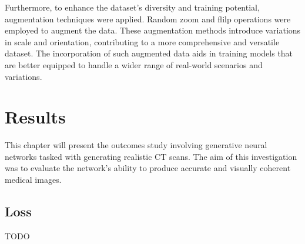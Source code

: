 \documentclass[11pt,a4paper]{report}
\begin{document}
Furthermore, to enhance the dataset's diversity and training potential, augmentation techniques were applied. Random zoom and flilp operations were employed to augment the data. These augmentation methods introduce variations in scale and orientation, contributing to a more comprehensive and versatile dataset. The incorporation of such augmented data aids in training models that are better equipped to handle a wider range of real-world scenarios and variations.


\chapter{Results}
This chapter will present the outcomes study involving generative neural networks tasked with generating realistic CT scans. The aim of this investigation was to evaluate the network's ability to produce accurate and visually coherent medical images.

\section{Loss}
TODO
\end{document}
